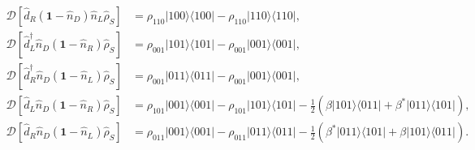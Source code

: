 \begin{appendixs}
\begin{align*}
    \mathcal{D}[\hat{d}_{R}(\textbf{1}-\hat{n}_{D})\hat{n}_{L}\hat{\rho}_{S}] & = \rho_{110}|100\rangle \langle 100| - \rho_{110}|110\rangle \langle 110|, \\  
    \mathcal{D}[\hat{d}^{\dagger}_{L}\hat{n}_{D}(\textbf{1}-\hat{n}_{R})\hat{\rho}_{S}] & = \rho_{001}|101\rangle \langle 101| - \rho_{001}|001\rangle \langle 001|, \\ 
    \mathcal{D}[\hat{d}^{\dagger}_{R}\hat{n}_{D}(\textbf{1}-\hat{n}_{L})\hat{\rho}_{S}] & = \rho_{001}|011\rangle \langle 011| - \rho_{001}|001\rangle \langle 001|, \\  
    \mathcal{D}[\hat{d}_{L}\hat{n}_{D}(\textbf{1}-\hat{n}_{R})\hat{\rho}_{S}] & = \rho_{101}|001\rangle \langle 001| - \rho_{101}|101\rangle \langle 101| - \frac{1}{2}(\beta |101\rangle \langle 011| + \beta^{*}|011\rangle \langle 101|), \\ 
    \mathcal{D}[\hat{d}_{R}\hat{n}_{D}(\textbf{1}-\hat{n}_{L})\hat{\rho}_{S}] & = \rho_{011}|001\rangle \langle 001| - \rho_{011}|011\rangle \langle 011| - \frac{1}{2}(\beta^{*} |011\rangle \langle 101| + \beta|101\rangle \langle 011|).
\end{align*}


\end{appendixs}
